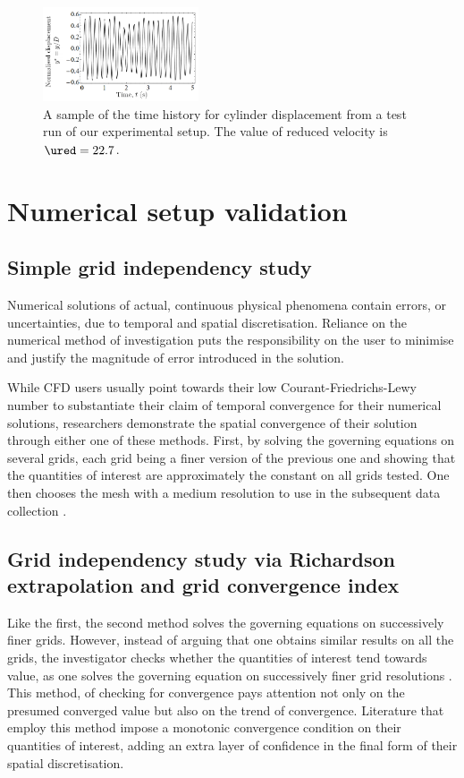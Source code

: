 \documentclass[a4paper,fleqn]{cas-sc}
\begin{document}
\begin{figure}
  \centering
  \includegraphics[width=0.41\textwidth]{figs/figure5}
  \caption{A sample of the time history for cylinder displacement from a test run of our experimental setup. The value of reduced velocity is $\ured = 22.7$.}
  \label{fig:sampTimeHist}
\end{figure}

\section{Numerical setup validation} \label{sec:numSetup}
\subsection{Simple grid independency study} \label{ssec:simpGCI}
Numerical solutions of actual, continuous physical phenomena contain errors, or uncertainties, due to temporal and spatial discretisation. Reliance on the numerical method of investigation puts the responsibility on the user to minimise and justify the magnitude of error introduced in the solution.

While CFD users usually point towards their low Courant-Friedrichs-Lewy number to substantiate their claim of temporal convergence for their numerical solutions, researchers demonstrate the spatial convergence of their solution through either one of these methods. First, by solving the governing equations on several grids, each grid being a finer version of the previous one and showing that the quantities of interest are approximately the constant on all grids tested. One then chooses the mesh with a medium resolution to use in the subsequent data collection \citep{Wu2011,Ding2013,Ding2015a,Ding2019}.

\subsection{Grid independency study via Richardson extrapolation and grid convergence index} \label{ssec:richExtrap}
Like the first, the second method solves the governing equations on successively finer grids. However, instead of arguing that one obtains similar results on all the grids, the investigator checks whether the quantities of interest tend towards value, as one solves the governing equation on successively finer grid resolutions \citep{Richardson1927,Stern2001}. This method, of checking for convergence pays attention not only on the presumed converged value but also on the trend of convergence. Literature that employ this method impose a monotonic convergence condition \citep{Stern2001,MatAli2011,Ali2012,Maruai2018} on their quantities of interest, adding an extra layer of confidence in the final form of their spatial discretisation.
\end{document}
